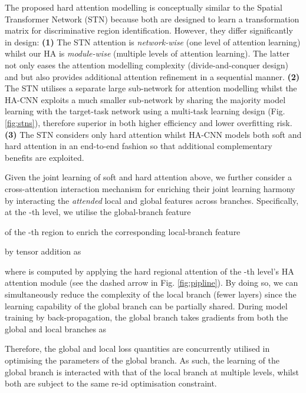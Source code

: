 \documentclass[10pt,twocolumn,letterpaper]{article}
\begin{document}
\vspace{0.01cm}
The proposed hard attention modelling is conceptually similar to
the Spatial Transformer Network (STN) \cite{jaderberg2015spatial}
because both are designed to learn a transformation matrix for discriminative region identification.
However, they differ significantly in design:
{\bf (1)} The STN attention is {\em network-wise} (one level of attention learning)
whilst our HA is {\em module-wise} (multiple levels of attention learning).
The latter not only eases the attention modelling complexity (divide-and-conquer design) and 
but also provides additional attention refinement in a sequential manner.
{\bf (2)} The STN utilises a separate large sub-network 
for attention modelling
whilst the HA-CNN exploits a much smaller sub-network 
by sharing the majority model learning with the target-task network
using a multi-task learning design (Fig. \ref{fig:stns}),
therefore superior in both higher efficiency and lower overfitting risk. 
{\bf (3)} The STN considers only hard attention 
whilst HA-CNN models both soft and hard attention in an end-to-end fashion
so that additional complementary benefits are exploited.

\vspace{0.01cm}
Given the joint learning of soft and hard attention above, 
we further consider a cross-attention interaction mechanism
for enriching their joint learning harmony
by interacting the {\em attended} local and global features across branches.
Specifically, 
at the -th level, 
we utilise the global-branch feature 

of the -th region to
enrich the corresponding 
local-branch feature

by tensor addition as

where  is computed by
applying the hard regional attention of the -th level's HA attention module
(see the dashed arrow in Fig. \ref{fig:pipline}).
By doing so, we can simultaneously reduce the complexity of the local branch (fewer layers)
since the learning capability of the global branch can be partially shared.
During model training by back-propagation, 
the global branch takes gradients from both the global and local branches as


Therefore, the global  and local  loss 
quantities are concurrently utilised in optimising the parameters 
of the global branch.
As such, the learning of the global branch is interacted with that of
the local branch at multiple levels, whilst both are subject to the same re-id optimisation constraint.
\end{document}
